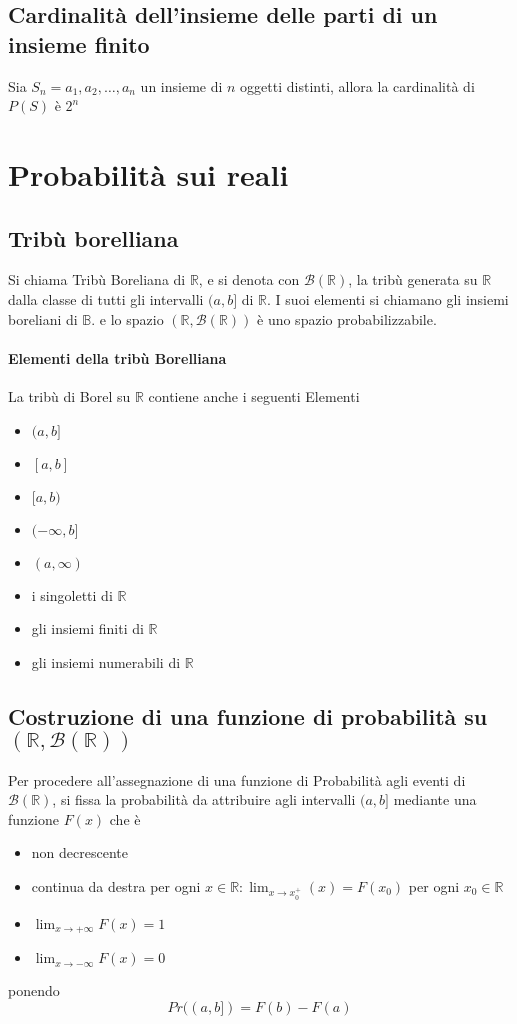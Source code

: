 \documentclass[a4paper]{report}
\begin{document}
  \section{Cardinalità dell'insieme delle parti di un insieme finito}
  Sia $S_n={a_1,a_2,\dots,a_n}$ un insieme di $n$ oggetti distinti, allora la cardinalità di $P(S)$ è $ 2^n$

  \chapter{Probabilità sui reali}
  \section{Tribù borelliana}
  Si chiama Tribù Boreliana di $\mathbb{R}$, e si denota con $\mathcal{B}(\mathbb{R})$, la tribù generata su $\mathbb{R}$ dalla classe di tutti gli intervalli $(a,b]$ di $\mathbb{R}$. I suoi elementi si chiamano gli insiemi boreliani di $\mathbb{B}$. e lo spazio $(\mathbb{R},\mathcal{B}(\mathbb{R}))$ è uno spazio probabilizzabile.

  \subsubsection{Elementi della tribù Borelliana}
  La tribù di Borel su $\mathbb{R}$ contiene anche i seguenti Elementi
  \begin{itemize}
    \item $(a,b]$
    \item $[a,b]$
    \item $[a,b)$
    \item $(-\infty, b]$
    \item $(a, \infty)$
    \item i singoletti di $\mathbb{R}$
    \item gli insiemi finiti di $\mathbb{R}$
    \item gli insiemi numerabili di $\mathbb{R}$
  \end{itemize}

  \section{Costruzione di una funzione di probabilità su $(\mathbb{R},\mathcal{B}(\mathbb{R}))$}
  Per procedere all'assegnazione di una funzione di Probabilità agli eventi di $\mathcal{B}(\mathbb{R})$, si fissa la probabilità da attribuire agli intervalli $(a,b]$ mediante una funzione $F(x)$ che è
  \begin{itemize}
    \item non decrescente
    \item continua da destra per ogni $x \in \mathbb{R}: \lim_{x\to x_0^+}(x) = F(x_0)$ per ogni $x_0 \in \mathbb{R}$
    \item $\lim_{x\to +\infty} F(x) = 1$
    \item $\lim_{x\to -\infty} F(x) = 0$
  \end{itemize}
  ponendo
  \[ Pr((a,b]) = F(b) - F(a) \]
\end{document}
